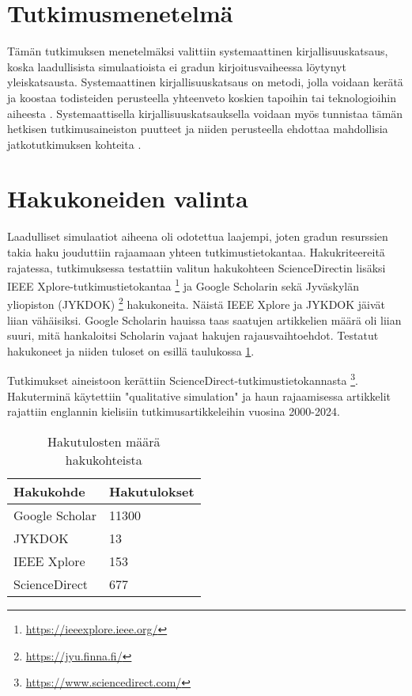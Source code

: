 \documentclass[utf8]{gradu3}
\begin{document}
\section{Tutkimusmenetelmä} \label{tutkimusmenetelmä}
Tämän tutkimuksen menetelmäksi valittiin systemaattinen kirjallisuuskatsaus, koska laadullisista simulaatioista ei gradun kirjoitusvaiheessa löytynyt yleiskatsausta. Systemaattinen kirjallisuuskatsaus on metodi, jolla voidaan kerätä ja koostaa todisteiden perusteella yhteenveto koskien tapoihin tai teknologioihin aiheesta \parencite{keele2007guidelines}. Systemaattisella kirjallisuuskatsauksella voidaan myös tunnistaa tämän hetkisen tutkimusaineiston puutteet ja niiden perusteella ehdottaa mahdollisia jatkotutkimuksen kohteita \parencite{keele2007guidelines}.

\section{Hakukoneiden valinta} \label{hakukoneiden valinta}
Laadulliset simulaatiot aiheena oli odotettua laajempi, joten gradun resurssien takia haku jouduttiin rajaamaan yhteen tutkimustietokantaa. Hakukriteereitä rajatessa, tutkimuksessa testattiin valitun hakukohteen ScienceDirectin lisäksi IEEE Xplore-tutkimustietokantaa \footnote{\url{https://ieeexplore.ieee.org/}} ja Google Scholarin sekä Jyväskylän yliopiston (JYKDOK) \footnote{\url{https://jyu.finna.fi/}} hakukoneita. Näistä IEEE Xplore ja JYKDOK jäivät liian vähäisiksi. Google Scholarin hauissa taas saatujen artikkelien määrä oli liian suuri, mitä hankaloitsi Scholarin vajaat hakujen rajausvaihtoehdot. Testatut hakukoneet ja niiden tuloset on esillä taulukossa \ref{table: hakutulokset}.

Tutkimukset aineistoon kerättiin ScienceDirect-tutkimustietokannasta \footnote{\url{https://www.sciencedirect.com/}}. Hakuterminä käytettiin "qualitative simulation" ja haun rajaamisessa artikkelit rajattiin englannin kielisiin tutkimusartikkeleihin vuosina 2000-2024. 

\begin{table}[]
\centering
\begin{tabular}{|l|l|}
\hline
\textbf{Hakukohde} & \textbf{Hakutulokset} \\ \hline
Google Scholar     & 11300                 \\ \hline
JYKDOK             & 13                    \\ \hline
IEEE Xplore        & 153                   \\ \hline
ScienceDirect      & 677                   \\ \hline
\end{tabular}
\caption{Hakutulosten määrä hakukohteista}
\label{table: hakutulokset}
\end{table}
\end{document}

